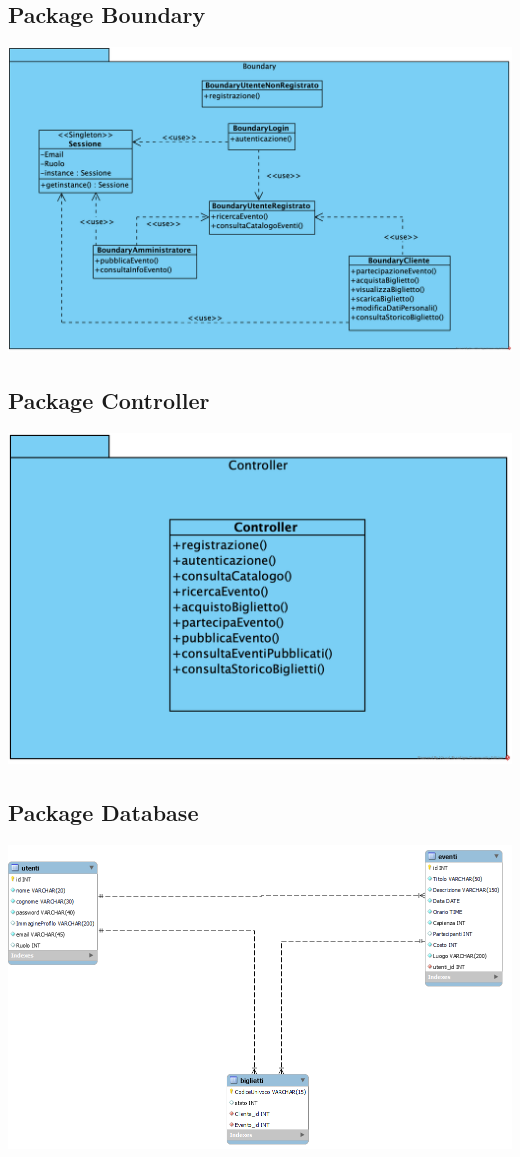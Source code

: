 \subsection{Package Boundary}
\begin{center}	
	\vspace{1ex}
	\includegraphics[height=0.38\linewidth]{assets/package/PackageBoundary.png}
	\vspace{1ex}
\end{center}
\subsection{Package Controller}
\begin{center}	
	\vspace{1ex}
	\includegraphics[height=0.38\linewidth]{assets/package/PackageController.png}
	\vspace{1ex}
\end{center}
\subsection{Package Database}

\begin{center}	
	\vspace{1ex}
	\includegraphics[height=0.38\linewidth]{assets/package/erdiagram.png}
	\vspace{1ex}
\end{center}

